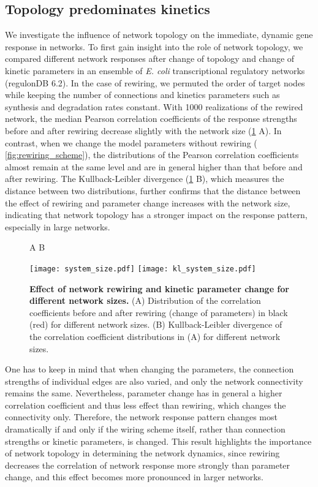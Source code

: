 \subsection{Topology predominates kinetics}
\label{sec:topology_kinetics}
We investigate the influence of network topology on the immediate, dynamic gene response in networks. 
To first gain insight into the role of network topology, we compared
different network responses after change of topology and change of kinetic
parameters in an ensemble of \emph{E. coli} transcriptional
regulatory networks (regulonDB 6.2).
In the case of rewiring, we permuted the order of target nodes while keeping
the number of connections and kinetics parameters such as synthesis and 
degradation rates constant. With 1000 realizations of the
rewired network, the median Pearson correlation coefficients of the response
strengths before and after rewiring decrease slightly with the network size 
(\ref{fig:system_size} A). 
In contrast, when we 
change the model parameters without rewiring (%
\ref{fig:rewiring_scheme}), the distributions of the Pearson correlation coefficients almost remain
at the same level and 
are in general higher than that before and after rewiring. The Kullback-Leibler
divergence (\ref{fig:system_size} B), which measures the distance between two distributions, further 
confirms that the distance between the effect of rewiring and parameter change 
increases with the network size, indicating that network topology has a stronger 
impact on the response pattern, especially in large networks. 

\begin{figure}[!ht]
\hskip 0.5in A \hskip 2.5in B
\begin{center}
\texttt{[image: system\_size.pdf]}
\texttt{[image: kl\_system\_size.pdf]}
\end{center}
\caption[Effect of rewiring and parameter change]{
{\bf Effect of network rewiring and kinetic parameter change for different network
sizes.} 
(A) Distribution of the correlation coefficients
before and after rewiring (change of parameters) in black (red) for 
different network sizes. (B) Kullback-Leibler divergence of the 
correlation coefficient distributions in (A) for different network
sizes.
}
\label{fig:system_size}
\end{figure}

One has to keep in mind that when changing the parameters,
the connection strengths of individual edges are also varied,
and only the network connectivity remains the same. Nevertheless,
parameter change has in general a higher correlation coefficient
and thus less effect than rewiring, which changes the connectivity only.
Therefore, the network response pattern changes most dramatically
if and only if the wiring scheme
itself, rather than connection strengths or 
kinetic parameters, is changed.
This result highlights the importance of network topology in
determining the network dynamics, 
since rewiring decreases
the correlation of network response more strongly than 
parameter change, and this effect becomes more pronounced in
larger networks. 

